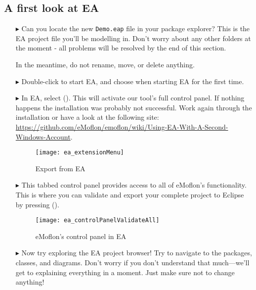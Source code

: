 \clearpage
\genHeader

\subsection{A first look at EA}

\begin{itemize}
\FloatBarrier
\hypertarget{simpleDemo vis}{}
\item[$\blacktriangleright$] Can you locate the new \texttt{Demo.eap} file in your package explorer? This is the EA project file you'll be
modelling in. Don't worry about any other folders at the moment - all problems will be resolved by the end of this section.

In the meantime, do not rename, move, or delete anything.

\item[$\blacktriangleright$] Double-click  to start EA, and choose  when starting EA for the first time.

\item[$\blacktriangleright$] In EA, select  ().
This will activate our tool's full control panel.
If nothing happens the installation was probably not successful. 
Work again through the installation or have a look at the following site:
\newline
\href{https://github.com/eMoflon/emoflon/wiki/Using-EA-With-A-Second-Windows-Account}{https://github.com/eMoflon/emoflon/wiki/Using-EA-With-A-Second-Windows-Account}.
%
\begin{figure}[htbp]
	\centering
  \texttt{[image: ea\_extensionMenu]}
	\caption{Export from EA} 
	\label{ea:validate_dropdown} 
\end{figure}
%
\item[$\blacktriangleright$]
This tabbed control panel provides access to all of eMoflon's functionality.
This is where you can validate and export your complete project to Eclipse by pressing  ().
%
\begin{figure}[htbp]
	\centering
  \texttt{[image: ea\_controlPanelValidateAll]}
	\caption{eMoflon's control panel in EA} 
	\label{ea:controlPanel} 
\end{figure}
%
\item[$\blacktriangleright$]
Now try exploring the EA project browser!
Try to navigate to the packages, classes, and diagrams.
Don't worry if you don't understand that much---we'll get to explaining everything in a moment.
Just make sure not to change anything!


\end{itemize}
